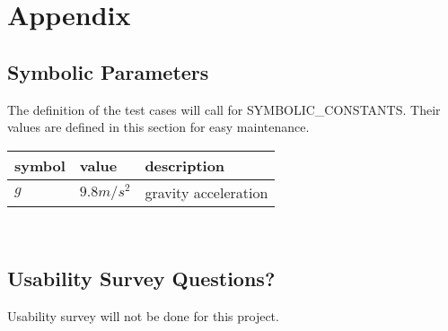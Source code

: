\documentclass[12pt, titlepage]{article}
\begin{document}
	
	
	
	
	\newpage
	
	\section{Appendix}
	
	\subsection{Symbolic Parameters}
	
	The definition of the test cases will call for SYMBOLIC\_CONSTANTS.
	Their values are defined in this section for easy maintenance.
	
	\begin{tabular}{l l l} 
		\toprule		
		\textbf{symbol} & \textbf{value} & \textbf{description}\\
		\midrule 
		$g$ & $9.8 m/s^{2}$ & gravity acceleration\\	
		\bottomrule
	\end{tabular}\\
	
	\subsection{Usability Survey Questions?}
	
	Usability survey will not be done for this project.
	
\end{document}
